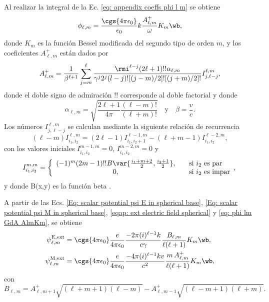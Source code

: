 Al realizar la integral de la Ec.  \eqref{eq: appendix coeffs phi l m} se obtiene \cite{de1999relativistic}
\begin{equation}
\phi_{\ell,m} = \frac{\cgs{4\pi\epsilon_0}}{\epsilon_0} k \frac{A_{\ell, m}^{+}}{\omega}K_m\wb,
\label{eq: phi lm GdA AlmKm}
\end{equation}
donde $K_m$ es la función Bessel modificada del segundo tipo de orden $m$, y los coeficientes $A_{\ell, m}^{+}$ están dados por
\begin{equation}
A_{\ell, m}^{+} = \frac{1}{\beta^{\ell +1}}\sum_{j=m}^{\ell}\frac{\rmi^{\ell - j} (2\ell + 1)!! \alpha_{\ell, m}}{\gamma^j 2^j (l-j)! [(j-m)/2]! [(j+m)/2]! } I_{j, \ell - j}^{\ell, m},
\end{equation}
donde el doble signo de admiración $!!$ corresponde al doble factorial y donde
\begin{equation}
\alpha_{\ell, m} = \sqrt{\frac{2\ell + 1}{4\pi}\frac{(\ell-m)!}{(\ell +m)!}} \quad \text{y} \quad \beta = \frac{v}{c}.
\end{equation}
Los números $I_{j, \ell - j}^{\ell, m}$ se calculan mediante la siguiente relación de recurrencia
\begin{equation}
(\ell - m) I_{i_1,i_2}^{\ell,m}=(2\ell-1)I_{i_1,i_2+1}^{\ell-1,m}-(\ell + m -1)I_{i_1,i_2}^{\ell-2,m},
\end{equation}
con los valores iniciales $I_{i_1,i_2}^{m-1,m}=0$, $I_{i_1,i_2}^{m-2,m}=0$ y
\begin{equation}
I_{i_1,i_2}^{m,m} = 
\left\{ 
  \begin{array}{ c l }
    (-1)^m (2m-1)!! B\var{\frac{i_1 + m +2}{2}, \frac{i_2+1}{2}}, & \quad \textrm{si } i_2 \textrm{ es par} \\
    0,                 & \quad \textrm{si } i_2 \textrm{ es impar}
  \end{array},
\right.
\end{equation}
y donde B(x,y) es la función beta \citep{Abramowitz}.

A partir de las Ecs. \eqref{Eq: scalar potential psi E in spherical base}, \eqref{Eq: scalar potential psi M in spherical base}, \eqref{eqap: ext electric field spherical} y \eqref{eq: phi lm GdA AlmKm}, se obtiene 
\begin{align}
\psi_{\ell, m}^{\rm E, ext} &= \cgs{4\pi\epsilon_0}\frac{e}{4\pi\epsilon_0}\frac{-2\pi(i)^{\ell-1}k}{c \gamma}\frac{B_{\ell,m}}{\ell(\ell+1)}K_m\wb, \\
\psi_{\ell, m}^{\rm M, ext} &= \cgs{4\pi\epsilon_0}\frac{e}{4\pi\epsilon_0}\frac{-4\pi(i)^{\ell-1}k v}{c^2}\frac{m\, A^{+}_{\ell,m}}{\ell(\ell+1)}K_m\wb,
\end{align}
con
\begin{equation}
B_{\ell, m} = A_{\ell,m+1}^{+}\sqrt{(\ell + m+1)(\ell-m)}-A_{\ell,m-1}^{+}\sqrt{(\ell - m+1)(\ell+m)}.
\end{equation}

